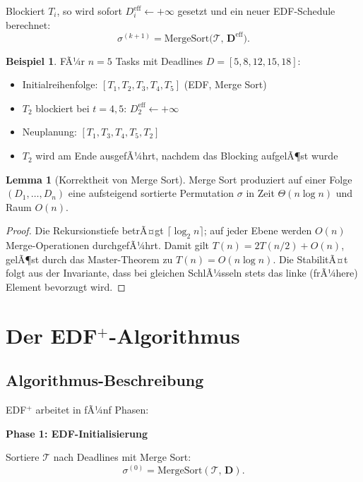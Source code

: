 ﻿\documentclass[a4paper,12pt]{article}
\theoremstyle{definition}
\newtheorem{beispiel}{Beispiel}
\newtheorem{lemma}{Lemma}
\begin{document}
	Blockiert $T_i$, so wird sofort $D_i^{\text{eff}} \leftarrow +\infty$ gesetzt
	und ein neuer EDF-Schedule berechnet:
	\[
	\sigma^{(k+1)} = \mathrm{MergeSort}\!\bigl(\mathcal{T},\, \mathbf{D}^{\text{eff}}\bigr).
	\]
	
	\begin{beispiel}
		FÃ¼r $n=5$ Tasks mit Deadlines $D = [5, 8, 12, 15, 18]$:
		\begin{itemize}
			\item Initialreihenfolge: $[T_1, T_2, T_3, T_4, T_5]$ (EDF, Merge Sort)
			\item $T_2$ blockiert bei $t=4{,}5$: $D_2^{\text{eff}} \leftarrow +\infty$
			\item Neuplanung: $[T_1, T_3, T_4, T_5, T_2]$
			\item $T_2$ wird am Ende ausgefÃ¼hrt, nachdem das Blocking aufgelÃ¶st wurde
		\end{itemize}
	\end{beispiel}
	
	\begin{lemma}[Korrektheit von Merge Sort]
		Merge Sort produziert auf einer Folge $(D_1,\ldots,D_n)$ eine aufsteigend
		sortierte Permutation $\sigma$ in Zeit $\Theta(n\log n)$ und Raum $O(n)$.
	\end{lemma}
	
	\begin{proof}
		Die Rekursionstiefe betrÃ¤gt $\lceil\log_2 n\rceil$; auf jeder Ebene werden
		$O(n)$ Merge-Opera\-tionen durchgefÃ¼hrt. Damit gilt $T(n) = 2T(n/2) + O(n)$,
		gelÃ¶st durch das Master-Theorem zu $T(n) = O(n\log n)$. Die StabilitÃ¤t
		folgt aus der Invariante, dass bei gleichen SchlÃ¼sseln stets das linke
		(frÃ¼here) Element bevorzugt wird.
	\end{proof}
	
	\section{Der EDF$^+$-Algorithmus}
	
	\subsection{Algorithmus-Beschreibung}
	
	EDF$^+$ arbeitet in fÃ¼nf Phasen:
	
	\textbf{Phase 1: EDF-Initialisierung}
	
	Sortiere $\mathcal{T}$ nach Deadlines mit Merge Sort:
	\[
	\sigma^{(0)} = \mathrm{MergeSort}(\mathcal{T},\, \mathbf{D}).
	\]
	
\end{document}
